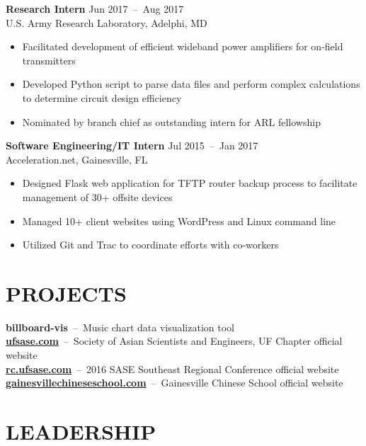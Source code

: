 \documentclass[line,resmargin]{res}
\begin{document}
\begin{resume}
    \textbf{Research Intern}    \hfill Jun 2017~--~Aug 2017 \\
    U.S. Army Research Laboratory, Adelphi, MD
    \begin{itemize}  \itemsep -2pt %
        \item Facilitated development of efficient wideband power amplifiers for on-field transmitters
        \item Developed Python script to parse data files and perform complex calculations to determine circuit design efficiency
        \item Nominated by branch chief as outstanding intern for ARL fellowship
    \end{itemize}

    \textbf{Software Engineering/IT Intern}    \hfill Jul 2015~--~Jan 2017 \\
    Acceleration.net, Gainesville, FL
    \begin{itemize}  \itemsep -2pt %
        \item Designed Flask web application for TFTP router backup process to facilitate management of 30+ offsite devices
        \item Managed 10+ client websites using WordPress and Linux command line
        \item Utilized Git and Trac to coordinate efforts with co-workers
    \end{itemize}

\section{PROJECTS}
    \textbf{billboard-vis}~--~Music chart data visualization tool \\
    \textbf{\href{http://ufsase.com}{ufsase.com}}~--~Society of Asian Scientists and Engineers, UF Chapter official website \\
    \textbf{\href{http://rc.ufsase.com}{rc.ufsase.com}}~--~2016 SASE Southeast Regional Conference official website \\
    \textbf{\href{https://gainesvillechineseschool.com}{gainesvillechineseschool.com}}~--~Gainesville Chinese School official website \\


\section{LEADERSHIP}


\end{resume}
\end{document}
